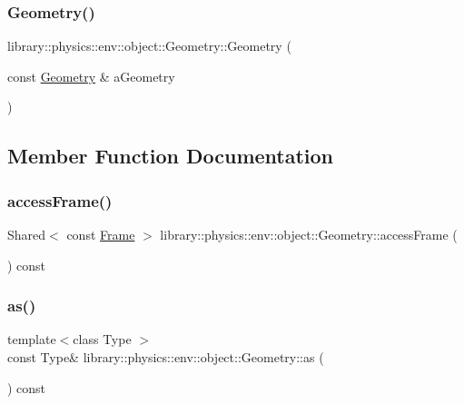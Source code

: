 \subsubsection{\texorpdfstring{Geometry()}{Geometry()}\hspace{0.1cm}{\footnotesize\ttfamily [3/3]}}
{\footnotesize\ttfamily library\+::physics\+::env\+::object\+::\+Geometry\+::\+Geometry (\begin{DoxyParamCaption}\item[{const \hyperlink{classlibrary_1_1physics_1_1env_1_1object_1_1_geometry}{Geometry} \&}]{a\+Geometry }\end{DoxyParamCaption})}



\subsection{Member Function Documentation}
\mbox{\label{classlibrary_1_1physics_1_1env_1_1object_1_1_geometry_a1a0569b5cdfba033d355057e215e22b8}} 
\subsubsection{\texorpdfstring{access\+Frame()}{accessFrame()}}
{\footnotesize\ttfamily Shared$<$ const \hyperlink{classlibrary_1_1physics_1_1coord_1_1_frame}{Frame} $>$ library\+::physics\+::env\+::object\+::\+Geometry\+::access\+Frame (\begin{DoxyParamCaption}{ }\end{DoxyParamCaption}) const}

\mbox{\label{classlibrary_1_1physics_1_1env_1_1object_1_1_geometry_a4bded0d750a47eaf975cf2f70dafe6e9}} 
\subsubsection{\texorpdfstring{as()}{as()}}
{\footnotesize\ttfamily template$<$class Type $>$ \\
const Type\& library\+::physics\+::env\+::object\+::\+Geometry\+::as (\begin{DoxyParamCaption}{ }\end{DoxyParamCaption}) const\hspace{0.3cm}{\ttfamily [inline]}}



